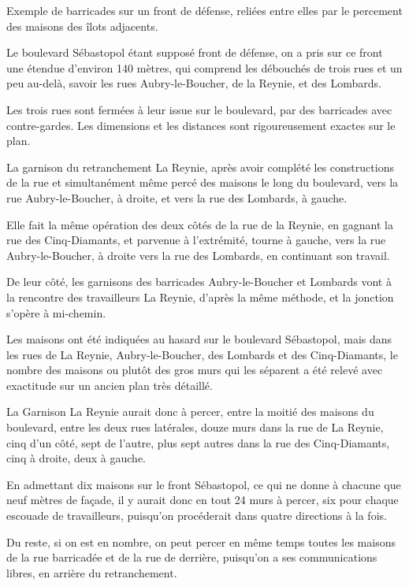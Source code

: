 \documentclass[french,twoside]{book} %
\begin{document}
\noindent Exemple de barricades sur un front de défense, reliées entre elles par le percement des maisons des îlots adjacents.\par
Le boulevard Sébastopol étant supposé front de défense, on a pris sur ce front une étendue d’environ 140 mètres, qui comprend les débouchés de trois rues et un peu au-delà, savoir les rues Aubry-le-Boucher, de la Reynie, et des Lombards.\par
Les trois rues sont fermées à leur issue sur le boulevard, par des barricades avec contre-gardes. Les dimensions et les distances sont rigoureusement exactes sur le plan.\par
La garnison du retranchement La Reynie, après avoir complété les constructions de la rue et simultanément même percé des maisons le long du boulevard, vers la rue Aubry-le-Boucher, à droite, et vers la rue des Lombards, à gauche.\par
Elle fait la même opération des deux côtés de la rue de la Reynie, en gagnant la rue des Cinq-Diamants, et parvenue à l’extrémité, tourne à gauche, vers la rue Aubry-le-Boucher, à droite vers la rue des Lombards, en continuant son travail.\par
De leur côté, les garnisons des barricades Aubry-le-Boucher et Lombards vont à la rencontre des travailleurs La Reynie, d’après la même méthode, et la jonction s’opère à mi-chemin.\par
Les maisons ont été indiquées au hasard sur le boulevard Sébastopol, mais dans les rues de La Reynie, Aubry-le-Boucher, des Lombards et des Cinq-Diamants, le nombre des maisons ou plutôt des gros murs qui les séparent a été relevé avec exactitude sur un ancien plan très détaillé.\par
La Garnison La Reynie aurait donc à percer, entre la moitié des maisons du boulevard, entre les deux rues latérales, douze murs dans la rue de La Reynie, cinq d’un côté, sept de l’autre, plus sept autres dans la rue des Cinq-Diamants, cinq à droite, deux à gauche.\par
En admettant dix maisons sur le front Sébastopol, ce qui ne donne à chacune que neuf mètres de façade, il y aurait donc en tout 24 murs à percer, six pour chaque escouade de travailleurs, puisqu’on procéderait dans quatre directions à la fois.\par
Du reste, si on est en nombre, on peut percer en même temps toutes les maisons de la rue barricadée et de la rue de derrière, puisqu’on a ses communications libres, en arrière du retranchement.\par
\end{document}
